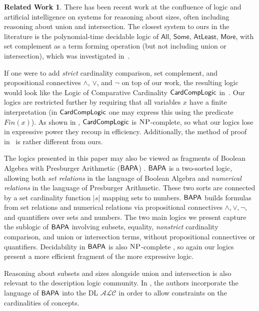 \documentclass[letterpaper]{article} %
\theoremstyle{definition}
\newtheorem*{relatedwork*}{Related Work}
\newcommand{\orr}{\vee}
\newcommand{\andd}{\wedge}
\newcommand{\nott}{\neg}
\newcommand{\BAPA}{\sf{BAPA}}
\newcommand{\CardCompLogic}{\sf{CardCompLogic}}
\newcommand{\NP}{\textsc{NP}}
\newcommand{\AllNoArgs}{\mathsf{All}}
\newcommand{\SomeNoArgs}{\mathsf{Some}}
\newcommand{\AtleastNoArgs}{\mathsf{AtLeast}}
\newcommand{\MoreNoArgs}{\mathsf{More}}
\begin{document}
\begin{relatedwork*}

There has been recent work at the confluence of logic and artificial intelligence on systems for reasoning about sizes, often including reasoning about union and intersection.
The closest system to ours in the literature is the polynomial-time decidable logic of $\AllNoArgs$, $\SomeNoArgs$,
$\AtleastNoArgs$, $\MoreNoArgs$, with set complement as a term forming
operation (but not including union or intersection), which was investigated in~\cite{syllogistic_cardinality_comparisons}.

If one were to add \emph{strict} cardinality comparison, set complement, and propositional connectives $\andd$, $\orr$, and $\nott$ on top of our work, the resulting logic would look like the Logic of Comparative Cardinality $\CardCompLogic$ in~\cite{DHH}.  Our logics are restricted further by requiring that all variables $x$ have a finite interpretation (in $\CardCompLogic$ one may express this using the predicate $Fin(x)$).
As shown in \cite{DHH}, $\CardCompLogic$ is $\NP$-complete, so what our logics lose in expressive power they recoup in efficiency.
Additionally, the method of proof in~\cite{DHH} is rather different from ours.

The logics presented in this paper may also be viewed as fragments of Boolean Algebra with Presburger Arithmetic ($\BAPA$) \cite{boolean_algebra_presburger_arithmetic}.
$\BAPA$ is a two-sorted logic, allowing both \emph{set relations} in the language of Boolean Algebra and \emph{numerical relations} in the language of Presburger Arithmetic. These two sorts are connected by a set cardinality function $|s|$ mapping sets to numbers. $\BAPA$ builds formulas from set relations and numerical relations via propositional connectives $\andd, \orr, \neg$, and quantifiers over sets and numbers.
The two main logics we present capture the sublogic of $\BAPA$ involving subsets, equality, \emph{nonstrict} cardinality comparison, and union or intersection terms, without propositional connectives or quantifiers.  Decidability in $\BAPA$ is also $\NP$-complete \cite{towards_efficient_bapa}, so again our logics present a more efficient fragment of the more expressive logic.

Reasoning about subsets and sizes alongside union and intersection is also relevant to the description logic community.  In \cite{extending_description_logic_ALC}, the authors incorporate the language of $\BAPA$ into the DL $\mathcal{ALC}$ in order to allow constraints on the cardinalities of concepts.
\end{relatedwork*}
\end{document}
